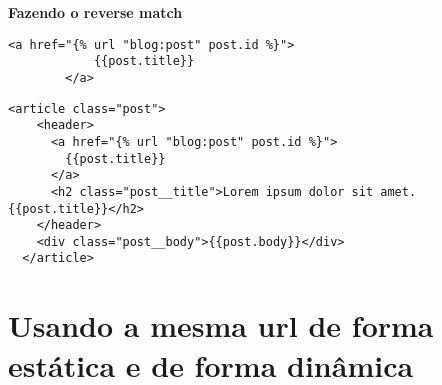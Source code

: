 \documentclass{article}
\begin{document}
\textbf{Fazendo o reverse match}

    \begin{lstlisting}[style=alteracoes_python, caption={Commit}]
        <a href="{% url "blog:post" post.id %}">
            {{post.title}}
        </a>
    \end{lstlisting}    



\begin{lstlisting}[style=djangohtml, caption={base/global/partials/postblock.html}]
    <article class="post">
    <header>
      <a href="{% url "blog:post" post.id %}">
        {{post.title}}
      </a>
      <h2 class="post__title">Lorem ipsum dolor sit amet.{{post.title}}</h2>
    </header>
    <div class="post__body">{{post.body}}</div>
  </article> 
\end{lstlisting}

\section{Usando a mesma url de forma estática e de forma dinâmica}
\end{document}
